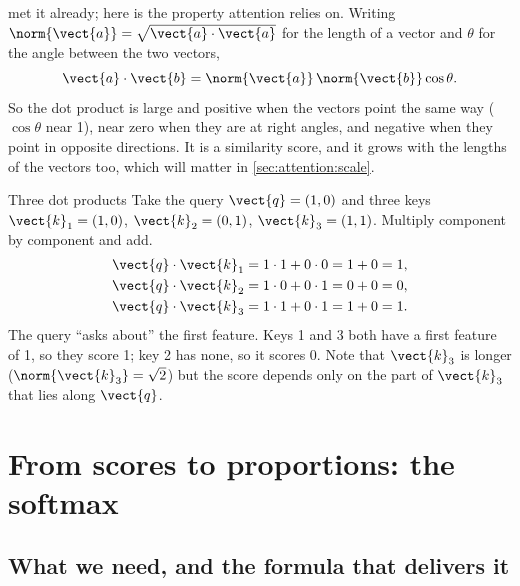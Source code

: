  met it already; here is the property attention relies on. Writing
$\norm{\vect{a}} = \sqrt{\vect{a}\cdot\vect{a}}$ for the length of a vector and $\theta$ for the
angle between the two vectors,
\begin{equation}\label{eq:attention:cos}
  \vect{a}\cdot\vect{b} = \norm{\vect{a}}\,\norm{\vect{b}}\cos\theta .
\end{equation}
So the dot product is large and positive when the vectors point the same way ($\cos\theta$ near
1), near zero when they are at right angles, and negative when they point in opposite directions.
It is a similarity score, and it grows with the lengths of the vectors too, which will matter in
\cref{sec:attention:scale}.

\begin{worked}[label={we:attention:dots}]{Three dot products}
Take the query $\vect{q} = (1, 0)$ and three keys $\vect{k}_1 = (1, 0)$, $\vect{k}_2 = (0, 1)$,
$\vect{k}_3 = (1, 1)$. Multiply component by component and add.
\begin{align*}
  \vect{q}\cdot\vect{k}_1 &= 1\cdot 1 + 0\cdot 0 = 1 + 0 = 1,\\
  \vect{q}\cdot\vect{k}_2 &= 1\cdot 0 + 0\cdot 1 = 0 + 0 = 0,\\
  \vect{q}\cdot\vect{k}_3 &= 1\cdot 1 + 0\cdot 1 = 1 + 0 = 1.
\end{align*}
The query ``asks about'' the first feature. Keys 1 and 3 both have a first feature of 1, so
they score 1; key 2 has none, so it scores 0. Note that $\vect{k}_3$ is longer
($\norm{\vect{k}_3} = \sqrt{2}$) but the score depends only on the part of $\vect{k}_3$ that lies
along $\vect{q}$.
\end{worked}

\section{From scores to proportions: the softmax}\label{sec:attention:softmax}

\subsection{What we need, and the formula that delivers it}

